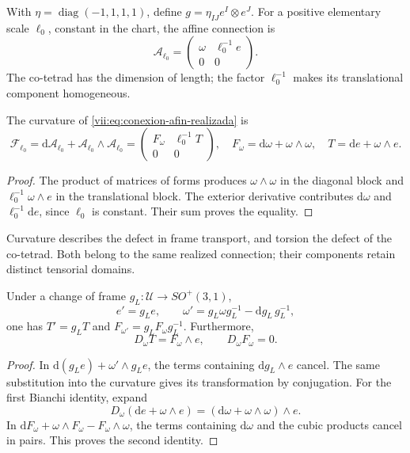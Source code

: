 With \(\eta=\operatorname{diag}(-1,1,1,1)\), define
\(g=\eta_{IJ}e^I\otimes e^J\). For a positive elementary scale
\(\ell_0\), constant in the chart, the affine connection is
\begin{equation}
 \mathcal A_{\ell_0}
 =\begin{pmatrix}\omega&\ell_0^{-1}e\\0&0\end{pmatrix}.
 \label{vii:eq:conexion-afin-realizada}
\end{equation}
The co-tetrad has the dimension of length; the factor
\(\ell_0^{-1}\) makes its translational component homogeneous.

\begin{proposition}
\label{vii:prop:curvatura-afin}
The curvature of \eqref{vii:eq:conexion-afin-realizada} is
\begin{equation}
 \mathcal F_{\ell_0}
 =\mathrm d\mathcal A_{\ell_0}
   +\mathcal A_{\ell_0}\wedge\mathcal A_{\ell_0}
 =\begin{pmatrix}F_\omega&\ell_0^{-1}T\\0&0\end{pmatrix},
 \quad F_\omega=\mathrm d\omega+\omega\wedge\omega,
 \quad T=\mathrm de+\omega\wedge e.
 \label{vii:eq:curvatura-afin-realizada}
\end{equation}
\end{proposition}
\begin{proof}
The product of matrices of forms produces
\(\omega\wedge\omega\) in the diagonal block and
\(\ell_0^{-1}\omega\wedge e\) in the translational block.
The exterior derivative contributes
\(\mathrm d\omega\) and \(\ell_0^{-1}\mathrm de\), since
\(\ell_0\) is constant. Their sum proves the equality.
\end{proof}

Curvature describes the defect in frame transport, and torsion the
defect of the co-tetrad. Both belong to the same realized connection;
their components retain distinct tensorial domains.

\begin{proposition}
\label{vii:prop:bianchi-cartan}
Under a change of frame \(g_L:\mathcal U\to SO^+(3,1)\),
\[
 e'=g_Le,\qquad
 \omega'=g_L\omega g_L^{-1}-\mathrm dg_L\,g_L^{-1},
\]
one has \(T'=g_LT\) and \(F_{\omega'}=g_LF_\omega g_L^{-1}\).
Furthermore,
\begin{equation}
 D_\omega T=F_\omega\wedge e,\qquad D_\omega F_\omega=0.
 \label{vii:eq:bianchi-realizacion}
\end{equation}
\end{proposition}
\begin{proof}
In \(\mathrm d(g_Le)+\omega'\wedge g_Le\), the terms
containing \(\mathrm dg_L\wedge e\) cancel.
The same substitution into the curvature gives its transformation by
conjugation. For the first Bianchi identity, expand
\[
 D_\omega(\mathrm de+\omega\wedge e)
 =(\mathrm d\omega+\omega\wedge\omega)\wedge e.
\]
In \(\mathrm dF_\omega+\omega\wedge F_\omega-F_\omega\wedge\omega\),
the terms containing \(\mathrm d\omega\) and the cubic
products cancel in pairs. This proves the second identity.
\end{proof}

